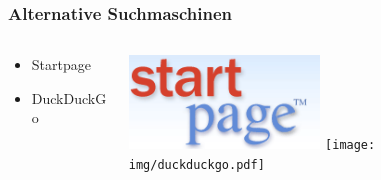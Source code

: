 \documentclass[12pt]{beamer}
\begin{document}
\begin{frame}
    \frametitle{Alternative Suchmaschinen}
    \begin{columns}
        \begin{column}{5cm}
            \begin{center}
                    \begin{itemize}
                            \item Startpage
                            \vspace{2cm}
                            \item DuckDuckGo
                    \end{itemize}
            \end{center}
        \end{column}
        \begin{column}{5cm}
            \begin{center}
                \includegraphics[width=0.5\textwidth]{img/startp_logo.png}
                \vspace{1cm}
                \texttt{[image: img/duckduckgo.pdf]}
            \end{center}
        \end{column}
    \end{columns}
\end{frame}
\end{document}
